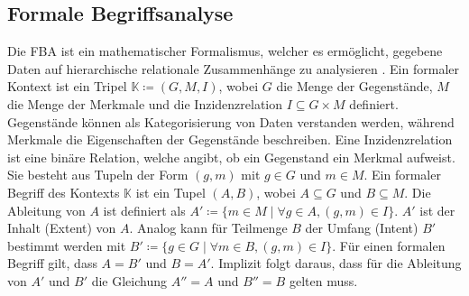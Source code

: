 \subsection{Formale Begriffsanalyse}\label{subsec:fca}
Die \ac{FBA} ist ein mathematischer Formalismus, welcher es ermöglicht, gegebene Daten auf hierarchische relationale Zusammenhänge zu analysieren \cite{formale-begriffsanalyse, formal-concept-analysis-wille}.
Ein formaler Kontext ist ein Tripel $\mathbb{K} \coloneqq (G, M, I)$, wobei $G$ die Menge der Gegenstände, $M$ die Menge der Merkmale und die Inzidenzrelation $I \subseteq G \times M$ definiert.
Gegenstände können als Kategorisierung von Daten verstanden werden, während Merkmale die Eigenschaften der Gegenstände beschreiben.
Eine Inzidenzrelation ist eine binäre Relation, welche angibt, ob ein Gegenstand ein Merkmal aufweist.
Sie besteht aus Tupeln der Form $(g,m)$ mit $g \in G$ und $m \in M$.
Ein formaler Begriff des Kontexts $\mathbb{K}$ ist ein Tupel $(A,B)$, wobei $A \subseteq G$ und $B \subseteq M$.
Die Ableitung von $A$ ist definiert als $A' \coloneqq \{m \in M \mid \forall g \in A, (g,m) \in I\}$.
$A'$ ist der Inhalt (Extent) von $A$.
Analog kann für Teilmenge $B$ der Umfang (Intent) $B'$ bestimmt werden mit $B' \coloneqq \{g \in G \mid \forall m \in B, (g,m) \in I\}$.
Für einen formalen Begriff gilt, dass $A = B'$ und $B = A'$.
Implizit folgt daraus, dass für die Ableitung von $A'$ und $B'$ die Gleichung $A'' = A$ und $B'' = B$ gelten muss.\\

\begin{center}
    \begin{table}[!ht]
        \centering
        \caption{Kreuztabelle - Nahrungsmittel}
        \label{table:fca-food}
    \end{table}
\end{center}

